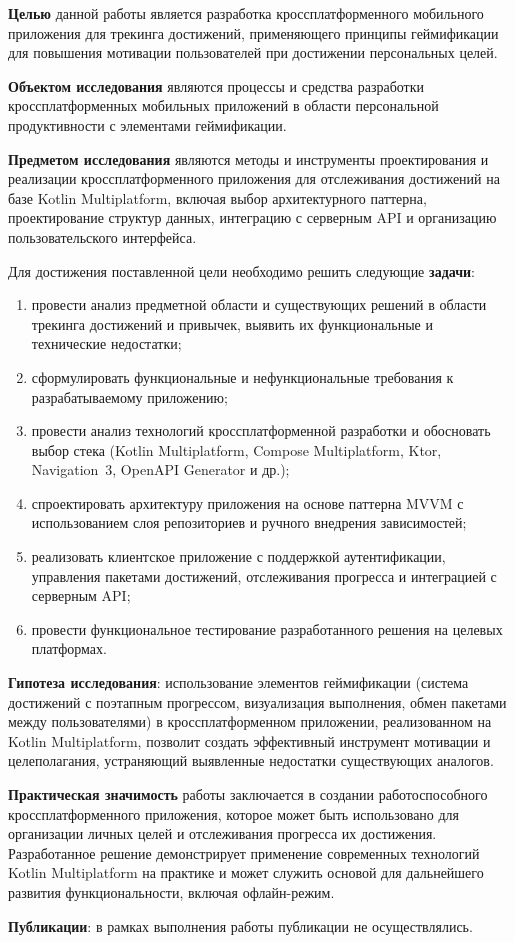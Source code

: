 \documentclass[../main.tex]{subfiles}
\begin{document}
	\textbf{Целью} данной работы является разработка кроссплатформенного мобильного приложения для трекинга достижений, применяющего принципы геймификации для повышения мотивации пользователей при достижении персональных целей.

	\textbf{Объектом исследования} являются процессы и средства разработки кроссплатформенных мобильных приложений в области персональной продуктивности с элементами геймификации.

	\textbf{Предметом исследования} являются методы и инструменты проектирования и реализации кроссплатформенного приложения для отслеживания достижений на базе Kotlin Multiplatform, включая выбор архитектурного паттерна, проектирование структур данных, интеграцию с серверным API и организацию пользовательского интерфейса.

	Для достижения поставленной цели необходимо решить следующие \textbf{задачи}:
	\begin{enumerate}[leftmargin=*]
		\item провести анализ предметной области и существующих решений в области трекинга достижений и привычек, выявить их функциональные и технические недостатки;
		\item сформулировать функциональные и нефункциональные требования к разрабатываемому приложению;
		\item провести анализ технологий кроссплатформенной разработки и обосновать выбор стека (Kotlin Multiplatform, Compose Multiplatform, Ktor, Navigation~3, OpenAPI Generator и др.);
		\item спроектировать архитектуру приложения на основе паттерна MVVM с использованием слоя репозиториев и ручного внедрения зависимостей;
		\item реализовать клиентское приложение с поддержкой аутентификации, управления пакетами достижений, отслеживания прогресса и интеграцией с серверным API;
		\item провести функциональное тестирование разработанного решения на целевых платформах.
	\end{enumerate}

	\textbf{Гипотеза исследования}: использование элементов геймификации (система достижений с поэтапным прогрессом, визуализация выполнения, обмен пакетами между пользователями) в кроссплатформенном приложении, реализованном на Kotlin Multiplatform, позволит создать эффективный инструмент мотивации и целеполагания, устраняющий выявленные недостатки существующих аналогов.

	\textbf{Практическая значимость} работы заключается в создании работоспособного кроссплатформенного приложения, которое может быть использовано для организации личных целей и отслеживания прогресса их достижения. Разработанное решение демонстрирует применение современных технологий Kotlin Multiplatform на практике и может служить основой для дальнейшего развития функциональности, включая офлайн-режим.

	\textbf{Публикации}: в рамках выполнения работы публикации не осуществлялись.
\end{document}
